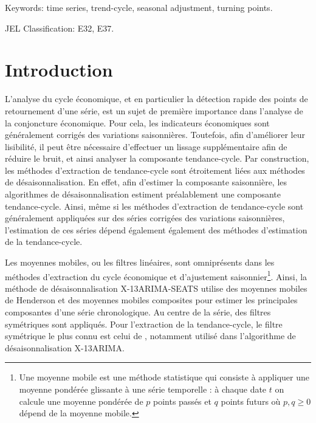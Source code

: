 \documentclass[
  12pt,
  a4paper,french]{article}
\newcommand\1{\mathds{1}}
\begin{document}
Keywords: time series, trend-cycle, seasonal adjustment, turning points.

JEL Classification: E32, E37.

\newpage

{
\hypersetup{linkcolor=}
\setcounter{tocdepth}{3}
\tableofcontents
}
\newpage

\hypertarget{introduction}{%
\section*{Introduction}\label{introduction}}

L'analyse du cycle économique, et en particulier la détection rapide des points de retournement d'une série, est un sujet de première importance dans l'analyse de la conjoncture économique.
Pour cela, les indicateurs économiques sont généralement corrigés des variations saisonnières.
Toutefois, afin d'améliorer leur lisibilité, il peut être nécessaire d'effectuer un lissage supplémentaire afin de réduire le bruit, et ainsi analyser la composante tendance-cycle.
Par construction, les méthodes d'extraction de tendance-cycle sont étroitement liées aux méthodes de désaisonnalisation.
En effet, afin d'estimer la composante saisonnière, les algorithmes de désaisonnalisation estiment préalablement une composante tendance-cycle.
Ainsi, même si les méthodes d'extraction de tendance-cycle sont généralement appliquées sur des séries corrigées des variations saisonnières, l'estimation de ces séries dépend également également des méthodes d'estimation de la tendance-cycle.

Les moyennes mobiles, ou les filtres linéaires, sont omniprésents dans les méthodes d'extraction du cycle économique et d'ajustement saisonnier\footnote{
  Une moyenne mobile est une méthode statistique qui consiste à appliquer une moyenne pondérée glissante à une série temporelle : à chaque date \(t\) on calcule une moyenne pondérée de \(p\) points passés et \(q\) points futurs où \(p,q\geq0\) dépend de la moyenne mobile.}.
Ainsi, la méthode de désaisonnalisation X-13ARIMA-SEATS utilise des moyennes mobiles de Henderson et des moyennes mobiles composites pour estimer les principales composantes d'une série chronologique.
Au centre de la série, des filtres symétriques sont appliqués.
Pour l'extraction de la tendance-cycle, le filtre symétrique le plus connu est celui de \textcite{henderson1916note}, notamment utilisé dans l'algorithme de désaisonnalisation X-13ARIMA.
\end{document}
